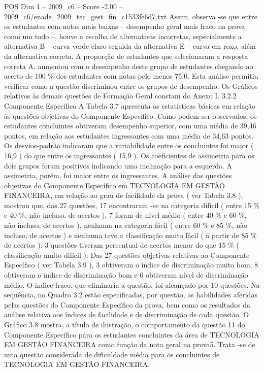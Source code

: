 \begin{textsample}{POS Dim 1 – 2009\_c6 – Score -2.00 – 2009\_c6/enade\_2009\_tec\_gest\_fin\_c1533fe6d7.txt}
Assim, observa -se que entre os estudantes com notas mais baixas – desempenho geral mais fraco na prova como um todo –, houve a escolha de alternativas incorretas, especialmente a alternativa B – curva verde claro seguida da alternativa E – curva em roxo, além da alternativa correta.
A proporção de estudantes que selecionaram a resposta correta A, aumentou com o desempenho deste grupo de estudantes chegando ao acerto de 100 \% dos estudantes com notas pelo menos 75,0.
Esta análise permitiu verificar como a questão discriminou entre os grupos de desempenho.
Os Gráficos relativos às demais questões de Formação Geral constam do Anexo I. 3.2.2 Componente Específico A Tabela 3.7 apresenta as estatísticas básicas em relação às questões objetivas do Componente Específico.
Como podem ser observados, os estudantes concluintes obtiveram desempenho superior, com uma média de 39,46 pontos, em relação aos estudantes ingressantes com uma média de 34,63 pontos.
Os desvios-padrão indicaram que a variabilidade entre os concluintes foi maior ( 16,9 ) do que entre os ingressantes ( 15,9 ).
Os coeficientes de assimetria para os dois grupos foram positivos indicando uma inclinação para a esquerda.
A assimetria, porém, foi maior entre os ingressantes.
A análise das questões objetivas do Componente Específico em TECNOLOGIA EM GESTÃO FINANCEIRA, em relação ao grau de facilidade da prova ( ver Tabela 3.8 ), mostrou que, das 27 questões, 17 encontraram -se na categoria difícil ( entre 15 \% e 40 \%, não incluso, de acertos ), 7 foram de nível médio ( entre 40 \% e 60 \%, não incluso, de acertos ), nenhuma na categoria fácil ( entre 60 \% e 85 \%, não incluso, de acertos ) e nenhuma teve a classificação muito fácil ( a partir de 85 \% de acertos ). 3 questões tiveram percentual de acertos menor do que 15 \% ( classificação muito difícil ).
Das 27 questões objetivas relativas ao Componente Específico ( ver Tabela 3.9 ), 3 obtiveram o índice de discriminação muito bom, 8 obtiveram o índice de discriminação bom e 6 obtiveram nível de discriminação médio.
O índice fraco, que eliminaria a questão, foi alcançado por 10 questões.
Na sequência, no Quadro 3.2 estão especificadas, por questão, as habilidades aferidas pelas questões do Componente Específico da prova, bem como os resultados da análise relativa aos índices de facilidade e de discriminação de cada questão.
O Gráfico 3.8 mostra, a título de ilustração, o comportamento da questão 11 do Componente Específico para os estudantes concluintes da área de TECNOLOGIA EM GESTÃO FINANCEIRA como função da nota geral na prova5.
Trata -se de uma questão considerada de dificuldade média para os concluintes de TECNOLOGIA EM GESTÃO FINANCEIRA.

\end{textsample}
